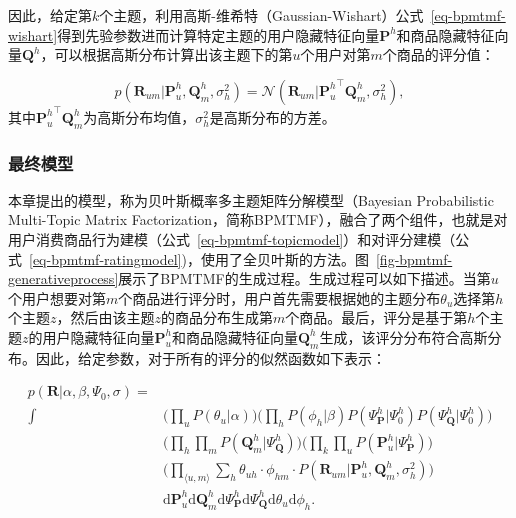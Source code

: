 因此，给定第$k$个主题，利用高斯-维希特（Gaussian-Wishart）公式~\ref{eq-bpmtmf-wishart}得到先验参数进而计算特定主题的用户隐藏特征向量$\mathbf{P}^{h}$和商品隐藏特征向量$\mathbf{Q}^{h}$，可以根据高斯分布计算出该主题下的第$u$个用户对第$m$个商品的评分值：

\begin{equation}
\label{eq-bpmtmf-ratingmodel}
p(\mathbf{R}_{um}|\mathbf{P}_u^{h},\mathbf{Q}_m^{h},\sigma_h^2)=\mathcal{N}(\mathbf{R}_{um}|{\mathbf{P}_{u}^{h}}^{\top} \mathbf{Q}_{m}^{h},\sigma_h^2),
\end{equation}
其中${\mathbf{P}_{u}^{h}}^{\top} \mathbf{Q}_{m}^{h}$为高斯分布均值，$\sigma_h^2$是高斯分布的方差。

\subsubsection{最终模型} 
本章提出的模型，称为贝叶斯概率多主题矩阵分解模型（Bayesian Probabilistic Multi-Topic Matrix Factorization，简称BPMTMF），融合了两个组件，也就是对用户消费商品行为建模（公式~\ref{eq-bpmtmf-topicmodel}）和对评分建模（公式~\ref{eq-bpmtmf-ratingmodel})，使用了全贝叶斯的方法。图~\ref{fig-bpmtmf-generativeprocess}展示了BPMTMF的生成过程。生成过程可以如下描述。当第$u$个用户想要对第$m$个商品进行评分时，用户首先需要根据她的主题分布$\theta_u$选择第$h$个主题$z$，然后由该主题$z$的商品分布生成第$m$个商品。最后，评分是基于第$h$个主题$z$的用户隐藏特征向量$\mathbf{P}_{u}^{h}$和商品隐藏特征向量$\mathbf{Q}_{m}^{h}$生成，该评分分布符合高斯分布。因此，给定参数，对于所有的评分的似然函数如下表示：

 \begin{align}
	\label{eq-bpmtmf-obj}
	p(\mathbf{R}|\alpha,\beta, \Psi_0,\sigma)=&\\
	\int &\big(\prod_u P(\theta_u|\alpha)\big)\big(\prod_h P(\phi_h|\beta)P(\Psi_{\mathbf{P}}^{h}|\Psi_0^{h})P(\Psi_{\mathbf{Q}}^{h}|\Psi_0^{h})\big)\nonumber\\
	&\big(\prod_h \prod_m P(\mathbf{Q}_m^{h}|\Psi_{\mathbf{Q}}^{h})\big)\big(\prod_k \prod_u P(\mathbf{P}_u^{h}|\Psi_{\mathbf{P}}^{h})\big)\nonumber\\
	&\big(\prod_{\langle u,m\rangle}\sum_{h} \theta_{uh}\cdot \phi_{hm}\cdot P(\mathbf{R}_{um}|\mathbf{P}_u^{h},\mathbf{Q}_m^{h}, \sigma_h^2)\big)\nonumber\\
	&\mathrm{d}\mathbf{P}_u^{h}\mathrm{d}\mathbf{Q}_m^{h}\mathrm{d}\Psi_{\mathbf{P}}^{h}\mathrm{d}\Psi_{\mathbf{Q}}^{h}\mathrm{d}\theta_u \mathrm{d}\phi_h.\nonumber
	\end{align}

